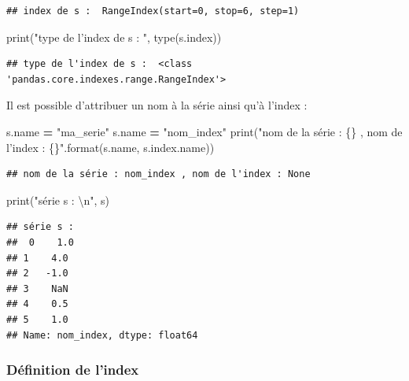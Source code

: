\documentclass[12pt,]{book}
\newenvironment{Shaded}{\begin{snugshade}}{\end{snugshade}}
\newcommand{\CharTok}[1]{\textcolor[rgb]{0.31,0.60,0.02}{#1}}
\newcommand{\SpecialCharTok}[1]{\textcolor[rgb]{0.00,0.00,0.00}{#1}}
\newcommand{\StringTok}[1]{\textcolor[rgb]{0.31,0.60,0.02}{#1}}
\newcommand{\OperatorTok}[1]{\textcolor[rgb]{0.81,0.36,0.00}{\textbf{#1}}}
\newcommand{\BuiltInTok}[1]{#1}
\newcommand{\NormalTok}[1]{#1}
\numberwithin{equation}{section}
\numberwithin{countremarque}{section}
\begin{document}
\begin{lstlisting}
## index de s :  RangeIndex(start=0, stop=6, step=1)
\end{lstlisting}

\begin{Shaded}
\begin{Highlighting}[]
\BuiltInTok{print}\NormalTok{(}\StringTok{"type de l'index de s : "}\NormalTok{, }\BuiltInTok{type}\NormalTok{(s.index))}
\end{Highlighting}
\end{Shaded}

\begin{lstlisting}
## type de l'index de s :  <class 'pandas.core.indexes.range.RangeIndex'>
\end{lstlisting}

Il est possible d'attribuer un nom à la série ainsi qu'à l'index :

\begin{Shaded}
\begin{Highlighting}[]
\NormalTok{s.name }\OperatorTok{=} \StringTok{"ma_serie"}
\NormalTok{s.name }\OperatorTok{=} \StringTok{"nom_index"}
\BuiltInTok{print}\NormalTok{(}\StringTok{"nom de la série : }\SpecialCharTok{\{\}}\StringTok{ , nom de l'index : }\SpecialCharTok{\{\}}\StringTok{"}\NormalTok{.}\BuiltInTok{format}\NormalTok{(s.name, s.index.name))}
\end{Highlighting}
\end{Shaded}

\begin{lstlisting}
## nom de la série : nom_index , nom de l'index : None
\end{lstlisting}

\begin{Shaded}
\begin{Highlighting}[]
\BuiltInTok{print}\NormalTok{(}\StringTok{"série s : }\CharTok{\textbackslash{}n}\StringTok{"}\NormalTok{, s)}
\end{Highlighting}
\end{Shaded}

\begin{lstlisting}
## série s : 
##  0    1.0
## 1    4.0
## 2   -1.0
## 3    NaN
## 4    0.5
## 5    1.0
## Name: nom_index, dtype: float64
\end{lstlisting}

\subsubsection{Définition de l'index}\label{definition-de-lindex}
\end{document}
